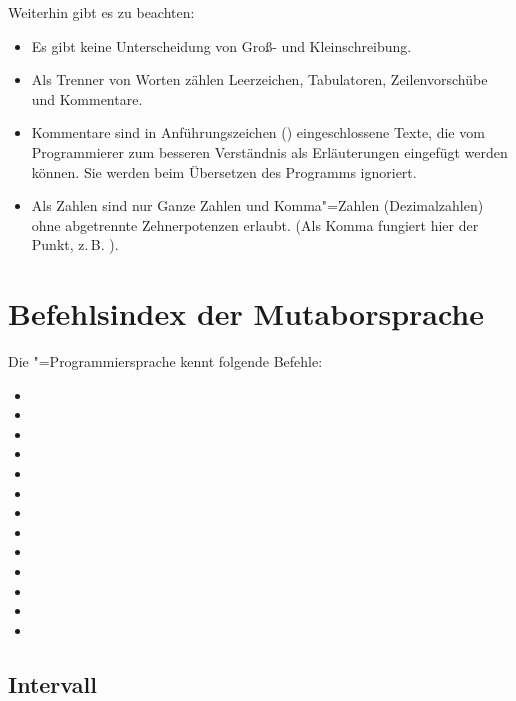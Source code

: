 Weiterhin gibt es zu beachten:

\begin{itemize}
\item Es gibt keine Unterscheidung von Groß- und Kleinschreibung.
\item Als Trenner von Worten zählen Leerzeichen, Tabulatoren,
  Zeilenvorschübe und Kommentare.
\item Kommentare sind in Anführungszeichen (\dq)
  eingeschlossene Texte, die vom Programmierer zum besseren
  Verständnis als Erläuterungen eingefügt werden können. Sie werden
  beim Übersetzen des Programms ignoriert.
\item Als Zahlen sind nur Ganze Zahlen und Komma"=Zahlen
  (Dezimalzahlen) ohne abgetrennte Zehnerpotenzen erlaubt. (Als Komma
  fungiert hier der Punkt, z.\,B. ).
\end{itemize}



\chapter{Befehlsindex der Mutaborsprache}\label{sec:SX_COMMANDS}

Die \mutabor{}"=Programmiersprache kennt folgende Befehle:

\begin{itemize}
\item {}
\item {}
\item {}
\item {}
\item {}
\item {}
\item {}
\item {}
\item {}
\item {}
\item {}
\item {}
\item {}
\end{itemize}

\section{Intervall}
\label{sec:SX_INTERVAL}


